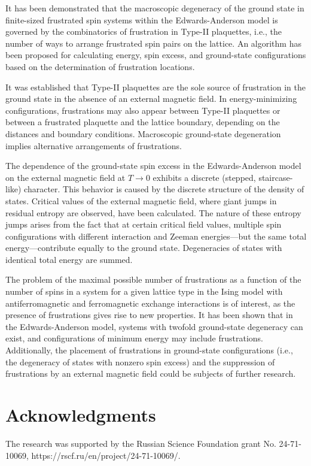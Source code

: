 \documentclass[preprint,12pt]{elsarticle}
\begin{document}
	It has been demonstrated that the macroscopic degeneracy of the ground state in finite-sized frustrated spin systems within the Edwards-Anderson model is governed by the combinatorics of frustration in  Type-II plaquettes, i.e., the number of ways to arrange frustrated spin pairs on the lattice. An algorithm has been proposed for calculating energy, spin excess, and ground-state configurations based on the determination of frustration locations.
	
	It was established that Type-II plaquettes are the sole source of frustration in the ground state in the absence of an external magnetic field. In energy-minimizing configurations, frustrations may also appear between Type-II plaquettes or between a frustrated plaquette and the lattice boundary, depending on the distances and boundary conditions. Macroscopic ground-state degeneration implies alternative arrangements of frustrations.
	
	The dependence of the ground-state spin excess in the Edwards-Anderson model on the external magnetic field at $T \to 0$ exhibits a discrete (stepped, staircase-like) character. This behavior is caused by the discrete structure of the density of states. Critical values of the external magnetic field, where giant jumps in residual entropy are observed, have been calculated. The nature of these entropy jumps arises from the fact that at certain critical field values, multiple spin configurations with different interaction and Zeeman energies—but the same total energy—contribute equally to the ground state. Degeneracies of states with identical total energy are summed.
	
	The problem of the maximal possible number of frustrations as a function of the number of spins in a system for a given lattice type in the Ising model with antiferromagnetic and ferromagnetic exchange interactions is of interest, as the presence of frustrations gives rise to new properties. It has been shown that in the Edwards-Anderson model, systems with twofold ground-state degeneracy can exist, and configurations of minimum energy may include frustrations. Additionally, the placement of frustrations in ground-state configurations (i.e., the degeneracy of states with nonzero spin excess) and the suppression of frustrations by an external magnetic field could be subjects of further research.
	
	
	\section{Acknowledgments}
	
	The research was supported by the Russian Science Foundation grant No. 24-71-10069, https://rscf.ru/en/project/24-71-10069/.
	
	
	
	
\end{document}
